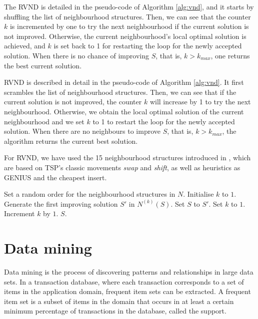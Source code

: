 \documentclass{singlecol-new}
\begin{document}
The RVND is detailed in the pseudo-code of Algorithm \ref{alg:vnd}, and it starts by shuffling the list of neighbourhood structures. Then, we can see that the counter $k$ is incremented by one to try the next neighbourhood if the current solution is not improved.
Otherwise, the current neighbourhood's local optimal solution is achieved, and $k$ is set back to 1 for restarting the loop for the newly accepted solution.
When there is no chance of improving $S$, that is, $k > k_{max}$, one returns the best current solution.

RVND is described in detail in the pseudo-code of Algorithm \ref{alg:vnd}. It first scrambles the list of neighbourhood structures. Then, we can see that if the current solution is not improved, the counter $k$ will increase by 1 to try the next neighbourhood. Otherwise, we obtain the local optimal solution of the current neighbourhood and we set $k$ to 1 to restart the loop for the newly accepted solution. When there are no neighbours to improve $S$, that is, $k> k_{max}$, the algorithm returns the current best solution.


For RVND, we have used the 15 neighbourhood structures introduced in \citet{daSilva}, which are based on TSP's classic movements \textit{swap} and \textit{shift}, as well as heuristics as GENIUS and the cheapest insert.


\begin{algorithm}
\caption{\hspace{-1mm}: RVND($S, N$)}
\label{alg:vnd}
{\footnotesize
\begin{algorithmic}[1]
\STATE Set a random order for the neighbourhood structures in $N$.
\STATE Initialise $k$ to $1$.
\STATE Generate the first improving solution $S'$ in $N^{(k)}(S)$.
\STATE Set $S$ to $S'$.
\STATE Set $k$ to $1$.
\ELSE
\STATE Increment $k$ by $1$.
\ENDIF
\ENDWHILE
\RETURN $S$.
\end{algorithmic}
}
\end{algorithm}

\section{Data mining}

\label{sec:datamining}

Data mining is the process of discovering patterns and relationships in large data sets. In a transaction database, where each transaction corresponds to a set of items in the application domain, frequent item sets can be extracted. A frequent item set is a subset of items in the domain that occurs in at least a certain minimum percentage of transactions in the database, called the support.
\end{document}
